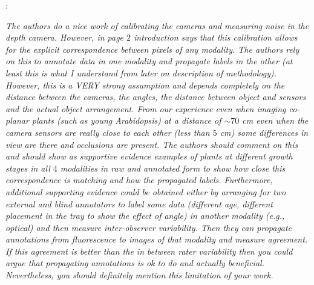 \documentclass[11pt,letterpaper]{article}
\newcounter{reviewcounter}
\newenvironment{review}
{\noindent {\bf Comment~\arabic{reviewcounter}}:\addtocounter{reviewcounter}{1}\itshape}
{\vspace{0.8em}}
\begin{document}
\begin{review}
The authors do a nice work of calibrating the cameras and measuring noise in the depth camera.
However, in page $2$ introduction says that this calibration allows for the explicit correspondence between pixels of any modality.
The authors rely on this to annotate data in one modality and propagate labels in the other (at least this is what I understand from later on description of methodology).
However, this is a VERY strong assumption and depends completely on the distance between the cameras, the angles, the distance between object and sensors and the actual object arrangement.
From our experience even when imaging co-planar plants (such as young Arabidopsis) at a distance of $\sim 70$ cm even when the camera sensors are really close to each other (less than $5$ cm) some differences in view are there and occlusions are present.
The authors should comment on this and should show as supportive evidence examples of plants at different growth stages in all $4$ modalities in raw and annotated form to show how close this correspondence is matching and how the propagated labels.
Furthermore, additional supporting evidence could be obtained either by arranging for two external and blind annotators to label some data (different age, different placement in the tray to show the effect of angle) in another modality (e.g., optical) and then measure inter-observer variability.
Then they can propagate annotations from fluorescence to images of that modality and measure agreement.
If this agreement is better than the in between rater variability then you could argue that propagating annotations is ok to do and actually beneficial.
Nevertheless, you should definitely mention this limitation of your work.
\end{review}
\end{document}
